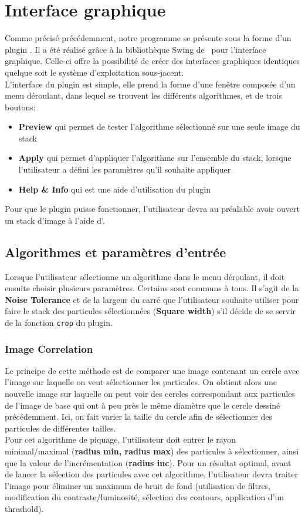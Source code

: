 \documentclass[11pt,a4paper]{report}
\begin{document}
\section{Interface graphique}
Comme précisé précédemment, notre programme se présente sous la forme d'un plugin \imj. Il a été réalisé grâce à la bibliothèque Swing de \java ~pour l'interface graphique. Celle-ci offre la possibilité de créer des interfaces graphiques identiques quelque soit le système d'exploitation sous-jacent.\\
L'interface du plugin est simple, elle prend la forme d'une fenêtre composée d'un menu déroulant, dans lequel se trouvent les différents algorithmes, et de trois boutons:
\begin{itemize}
\item \textbf{Preview} qui permet de tester l'algorithme sélectionné sur une seule image du stack
\item \textbf{Apply} qui permet d'appliquer l'algorithme sur l'ensemble du stack, lorsque l'utilisateur a défini les paramètres qu'il souhaite appliquer
\item \textbf{Help \& Info} qui est une aide d'utilisation du plugin
\end{itemize}
Pour que le plugin puisse fonctionner, l'utilisateur devra au préalable avoir ouvert un stack d'image à l'aide d'\imj. 

\subsection{Algorithmes et paramètres d'entrée}
Lorsque l'utilisateur sélectionne un algorithme dans le menu déroulant, il doit ensuite choisir plusieurs paramètres.
Certains sont communs à tous. Il s'agit de la \textbf{Noise Tolerance} et de la largeur du carré que l'utilisateur souhaite utiliser pour faire le stack des particules sélectionnées (\textbf{Square width}) s'il décide de se servir de la fonction \texttt{crop} du plugin.

\subsubsection{Image Correlation}
Le principe de cette méthode est de comparer une image contenant un cercle avec l'image sur laquelle on veut sélectionner les particules. On obtient alors une nouvelle image sur laquelle on peut voir des cercles correspondant aux particules de l'image de base qui ont à peu près le même diamètre que le cercle dessiné précédemment. Ici, on fait varier la taille du cercle afin de sélectionner des particules de différentes tailles.\\
\noindent
Pour cet algorithme de piquage, l'utilisateur doit entrer le rayon minimal/maximal (\textbf{radius min, radius max}) des particules à sélectionner, ainsi que la valeur de l'incrémentation (\textbf{radius inc}). Pour un résultat optimal, avant de lancer la sélection des particules avec cet algorithme, l'utilisateur devra traiter l'image pour éliminer un maximum de bruit de fond (utilisation de filtres, modification du contraste/luminosité, sélection des contours, application d'un threshold).
\end{document}
